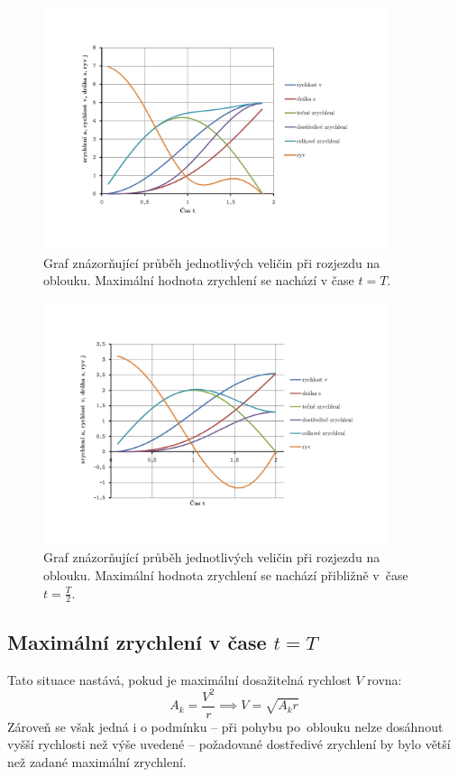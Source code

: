	\begin{figure}[H]
		\centering
		\includegraphics[width=0.9\textwidth]{img/graf_oblouk1.pdf}
		\caption{Graf znázorňující průběh jednotlivých veličin při rozjezdu na oblouku. Maximální hodnota zrychlení se nachází v čase $t=T$.}\label{graf:oblprubeh1}	
	\end{figure}
	\begin{figure}[H]
		\centering
		\includegraphics[width=0.9\textwidth]{img/graf_oblouk2.pdf}
		\caption{Graf znázorňující průběh jednotlivých veličin při rozjezdu na oblouku. Maximální hodnota zrychlení se nachází přibližně v~čase $t=\frac{T}{2}$.}\label{graf:oblprubeh2}	
	\end{figure}
	
		\subsection{Maximální zrychlení v čase $t=T$}\label{kap:maxT}
		Tato situace nastává, pokud je maximální dosažitelná rychlost $V$ rovna:
		\begin{equation}\label{rov:oblpodm}
			A_k = \frac{V^2}{r} \implies
			V=\sqrt{A_k r}
		\end{equation}
		Zároveň se však jedná i o podmínku -- při pohybu po~oblouku nelze dosáhnout vyšší rychlosti než výše uvedené -- požadované dostředivé zrychlení by bylo větší než zadané maximální zrychlení.
		
